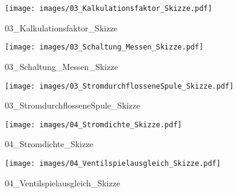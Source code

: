 %
%
\begin{figure}[!hb]%
    \centering
  \texttt{[image: images/03\_Kalkulationsfaktor\_Skizze.pdf]}%
  \caption{03_Kalkulationsfaktor_Skizze}%
\end{figure}

%
%
\begin{figure}[!hb]%
    \centering
  \texttt{[image: images/03\_Schaltung\_Messen\_Skizze.pdf]}%
  \caption{03_Schaltung_Messen_Skizze}%
\end{figure}

%
%
\begin{figure}[!hb]%
    \centering
  \texttt{[image: images/03\_StromdurchflosseneSpule\_Skizze.pdf]}%
  \caption{03_StromdurchflosseneSpule_Skizze}%
\end{figure}

%
%
\begin{figure}[!hb]%
    \centering
  \texttt{[image: images/04\_Stromdichte\_Skizze.pdf]}%
  \caption{04_Stromdichte_Skizze}%
\end{figure}

%
%
\begin{figure}[!hb]%
    \centering
  \texttt{[image: images/04\_Ventilspielausgleich\_Skizze.pdf]}%
  \caption{04_Ventilspielausgleich_Skizze}%
\end{figure}

